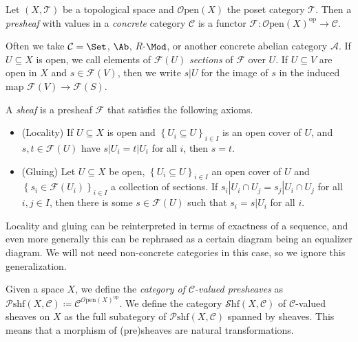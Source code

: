 \begin{definition}\label{1.1.12}
	Let $(X,\mathcal{T} )$ be a topological space and $\mathcal{O} \mathrm{pen} (X)$ the poset category $\mathcal{T} $. Then a \emph{presheaf} with values in a \emph{concrete} category $\mathcal{C} $ is a functor $\mathcal{F} : \mathcal{O} \mathrm{pen} (X)^{\mathrm{op}}  \to \mathcal{C} $.
\end{definition}
Often we take $\mathcal{C} =\Set $, $\Ab $, $R$-$\Mod$, or another concrete abelian category $\mathcal{A} $. If $U\subseteq X$ is open, we call elements of $\mathcal{F} (U)$ \emph{sections} of $\mathcal{F} $ over $U$. If $U\subseteq V$ are open in $X$ and $s\in \mathcal{F} (V)$, then we write $s|U$ for the image of $s$ in the induced map $\mathcal{F} (V)\to \mathcal{F} (S)$. 
\begin{definition}\label{1.1.13}
	 A \emph{sheaf} is a presheaf $\mathcal{F} $ that satisfies the following axioms.
	\begin{itemize}
		\item (Locality) If $U\subseteq X$ is open and $\left\{ U_i\subseteq U \right\} _{i\in I} $ is an open cover of $U$, and $s,t\in \mathcal{F} (U)$ have $s|U_i=t|U_i$ for all $i$, then $s=t$.
		\item (Gluing) Let $U\subseteq X$ be open, $\left\{ U_i\subseteq U \right\} _{i\in I} $ an open cover of $U$ and $\left\{ s_i\in \mathcal{F} (U_i) \right\} _{i\in I} $ a collection of sections. If $s_i|U_i \cap U_j=s_j|U_i \cap U_j$ for all $i,j\in I$, then there is some $s\in \mathcal{F} (U)$ such that $s_i=s|U_i$ for all $i$.
	\end{itemize}
\end{definition}

Locality and gluing can be reinterpreted in terms of exactness of a sequence, and even more generally this can be rephrased as a certain diagram being an equalizer diagram. We will not need non-concrete categories in this case, so we ignore this generalization.

\begin{notation}\label{1.1.14}
	Given a space $X$, we define the \emph{category of $\mathcal{C} $-valued presheaves} as $\mathcal{P} \mathrm{shf} (X,\mathcal{C} )\coloneqq \mathcal{C}^{\mathcal{O} \mathrm{pen} (X)^{\mathrm{op}} } $. We define the category $\mathcal{S} \mathrm{hf} (X,\mathcal{C} )$ of $\mathcal{C} $-valued sheaves on $X$ as the full subategory of $\mathcal{P} \mathrm{shf} (X,\mathcal{C} )$ spanned by sheaves. This means that a morphism of (pre)sheaves are natural transformations.
\end{notation}

